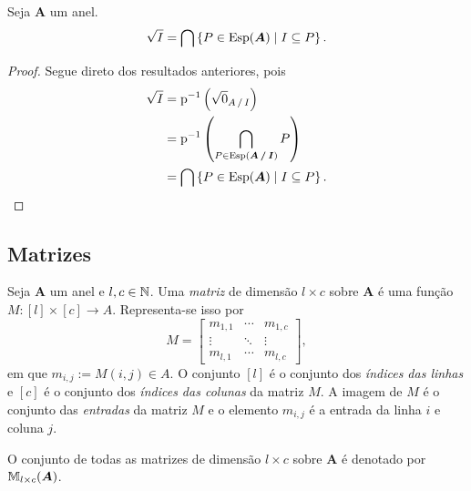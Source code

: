 \begin{proposition}
Seja $\bm A$ um anel.
	\begin{equation*}
	\sqrt{I} = \bigcap \left\{{P \in \operatorname{Esp}(\bm A)}\;\middle\vert\;{I \subseteq P}\right\}.
	\end{equation*}
\end{proposition}
\begin{proof}
		
Segue direto dos resultados anteriores, pois
	\begin{align*}
	\rad{I} &= \proj\inv \left( \rad{0}_{\quo{A}{I}} \right) \\
		&=\proj\inv \left( \bigcap_{P \in \Esp(\bm {\quo{A}{I}})} P \right) \\
		&= \bigcap \set{P \in \Esp(\bm A)}{I \subseteq P}.
		\qedhere
	\end{align*}
\end{proof}




\subsection{Matrizes}

\begin{definition}
	Seja $\bm A$ um anel e $l,c \in \mathbb{N}$. Uma \emph{matriz} de dimensão $l \times c$ sobre $\bm A$ é uma função $M: [l] \times [c] \to A$. Representa-se isso por
	\begin{equation*}
	M =
	\begin{bmatrix}
	m_{1,1} & \cdots & m_{1,c} \\
	\vdots & \ddots & \vdots \\
	m_{l,1} & \cdots & m_{l,c}
	\end{bmatrix},
	\end{equation*}
em que $m_{i,j} := M(i,j) \in A$. O conjunto $[l]$ é o conjunto dos \emph{índices das linhas} e $[c]$ é o conjunto dos \emph{índices das colunas} da matriz $M$. A imagem de $M$ é o conjunto das \emph{entradas} da matriz $M$ e o elemento $m_{i,j}$ é a entrada da linha $i$ e coluna $j$.

	O conjunto de todas as matrizes de dimensão $l \times c$ sobre $\bm A$ é denotado por $\mathbb{M}_{l \times c}(\bm A)$.
\end{definition}

